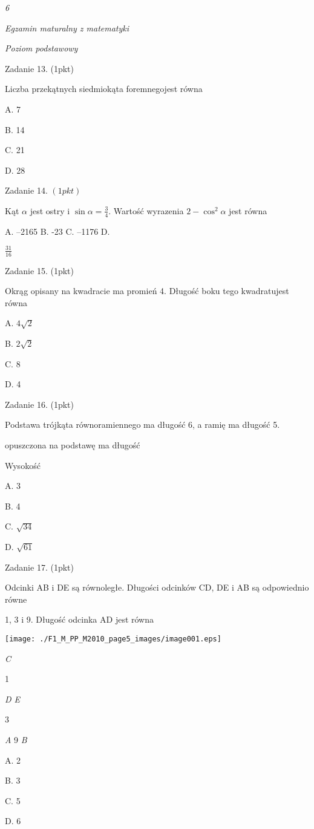 \documentclass[a4paper,12pt]{article}
\begin{document}
{\it 6}

{\it Egzamin maturalny z matematyki}

{\it Poziom podstawowy}

Zadanie 13. (1pkt)

Liczba przekątnych siedmiokąta foremnegojest równa

A. 7

B. 14

C. 21

D. 28

Zadanie 14. $(1pkt)$

Kąt $\alpha$ jest ostry i $\displaystyle \sin\alpha=\frac{3}{4}$. Wartość wyrazenia $ 2-\cos^{2}\alpha$ jest równa

A. --2165 B. -23 C. --1176 D.

$\displaystyle \frac{31}{16}$

Zadanie 15. (1pkt)

Okrąg opisany na kwadracie ma promień 4. Długość boku tego kwadratujest równa

A. $4\sqrt{2}$

B. $2\sqrt{2}$

C. 8

D. 4

Zadanie 16. (1pkt)

Podstawa trójkąta równoramiennego ma długość 6, a ramię ma długość 5.

opuszczona na podstawę ma długość

Wysokość

A. 3

B. 4

C. $\sqrt{34}$

D. $\sqrt{61}$

Zadanie 17. (1pkt)

Odcinki AB i DE są równoległe. Długości odcinków CD, DE i AB są odpowiednio równe

1, 3 i 9. Długość odcinka AD jest równa
\begin{center}
\texttt{[image: ./F1\_M\_PP\_M2010\_page5\_images/image001.eps]}
\end{center}
{\it C}

1

{\it D E}

3

{\it A}  9  {\it B}

A. 2

B. 3

C. 5

D. 6
\end{document}

